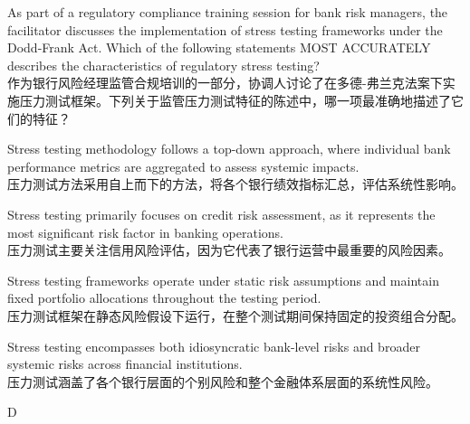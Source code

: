 \documentclass{article}
\newcounter{question} %
\begin{document}
\begin{question}
    As part of a regulatory compliance training session for bank risk managers, the facilitator discusses the implementation of stress testing frameworks under the Dodd-Frank Act. Which of the following statements MOST ACCURATELY describes the characteristics of regulatory stress testing?\\
    作为银行风险经理监管合规培训的一部分，协调人讨论了在多德-弗兰克法案下实施压力测试框架。下列关于监管压力测试特征的陈述中，哪一项最准确地描述了它们的特征？
\end{question}
    
\begin{choices}
    \item Stress testing methodology follows a top-down approach, where individual bank performance metrics are aggregated to assess systemic impacts. \\
    压力测试方法采用自上而下的方法，将各个银行绩效指标汇总，评估系统性影响。
    
    \item Stress testing primarily focuses on credit risk assessment, as it represents the most significant risk factor in banking operations. \\   
    压力测试主要关注信用风险评估，因为它代表了银行运营中最重要的风险因素。  
    \item Stress testing frameworks operate under static risk assumptions and maintain fixed portfolio allocations throughout the testing period. \\
    压力测试框架在静态风险假设下运行，在整个测试期间保持固定的投资组合分配。
    
    \item Stress testing encompasses both idiosyncratic bank-level risks and broader systemic risks across financial institutions. \\
    压力测试涵盖了各个银行层面的个别风险和整个金融体系层面的系统性风险。
\end{choices}
    
\begin{correctanswer}
    D
\end{correctanswer}
    
\end{document}
